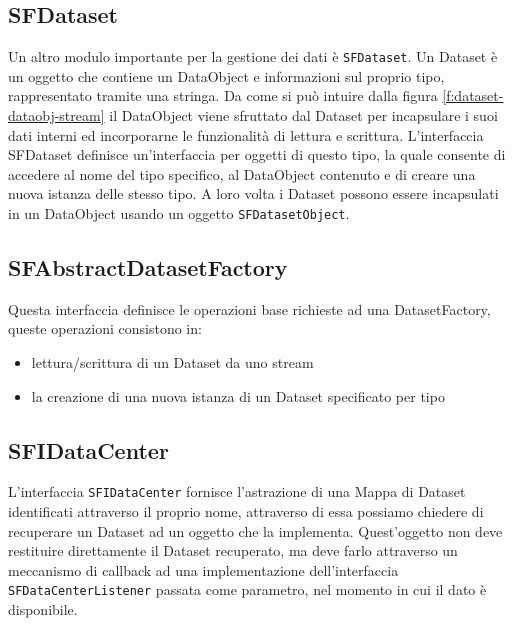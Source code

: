 \subsection{SFDataset}
\label{sub:sfdataset}
Un altro modulo importante per la gestione dei dati \`e \texttt{SFDataset}. Un Dataset \`e un oggetto che contiene un DataObject e informazioni sul proprio tipo, rappresentato tramite una stringa.
Da come si pu\`o intuire dalla figura \ref{f:dataset-dataobj-stream} il DataObject viene sfruttato dal Dataset per incapsulare i suoi dati interni ed incorporarne le funzionalit\`a di lettura e scrittura.
L'interfaccia SFDataset definisce un'interfaccia per oggetti di questo tipo, la quale consente di accedere al nome del tipo specifico, al DataObject contenuto e di creare una nuova istanza delle stesso tipo.
A loro volta i Dataset possono essere incapsulati in un DataObject usando un oggetto \texttt{SFDatasetObject}.

\subsection{SFAbstractDatasetFactory}
\label{sub:sfabstractdatasetfactory}
Questa interfaccia definisce le operazioni base richieste ad una DatasetFactory, queste operazioni consistono in:
\begin{itemize}
	\item lettura/scrittura di un Dataset da uno stream
	\item la creazione di una nuova istanza di un Dataset specificato per tipo
\end{itemize}

\subsection{SFIDataCenter}
\label{sub:sfidatacenter}
L'interfaccia \texttt{SFIDataCenter} fornisce l'astrazione di una Mappa di Dataset identificati attraverso il proprio nome, attraverso di essa possiamo chiedere di recuperare un Dataset ad un oggetto che la implementa.
Quest'oggetto non deve restituire direttamente il Dataset recuperato, ma deve farlo attraverso un meccanismo di callback ad una implementazione dell'interfaccia \texttt{SFDataCenterListener} passata come parametro, nel momento in cui il dato \`e disponibile.

